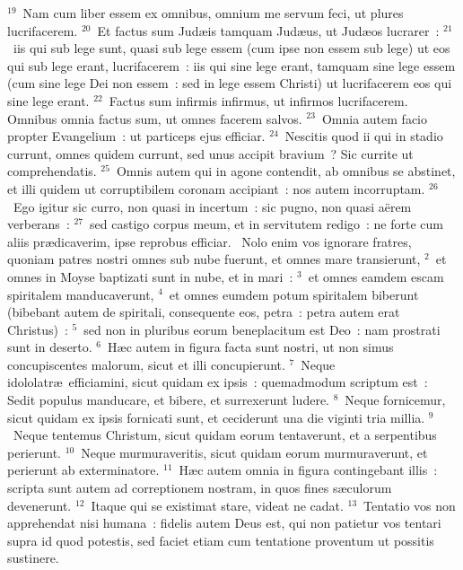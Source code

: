 ${}^{19}$~Nam cum liber essem ex omnibus, omnium me servum feci, ut plures lucrifacerem.
${}^{20}$~Et factus sum Jud\ae is tamquam Jud\ae us, ut Jud\ae os lucrarer~:
${}^{21}$~iis qui sub lege sunt, quasi sub lege essem (cum ipse non essem sub lege) ut eos qui sub lege erant, lucrifacerem~: iis qui sine lege erant, tamquam sine lege essem (cum sine lege Dei non essem~: sed in lege essem Christi) ut lucrifacerem eos qui sine lege erant.
${}^{22}$~Factus sum infirmis infirmus, ut infirmos lucrifacerem. Omnibus omnia factus sum, ut omnes facerem salvos.
${}^{23}$~Omnia autem facio propter Evangelium~: ut particeps ejus efficiar.
${}^{24}$~Nescitis quod ii qui in stadio currunt, omnes quidem currunt, sed unus accipit bravium~? Sic currite ut comprehendatis.
${}^{25}$~Omnis autem qui in agone contendit, ab omnibus se abstinet, et illi quidem ut corruptibilem coronam accipiant~: nos autem incorruptam.
${}^{26}$~Ego igitur sic curro, non quasi in incertum~: sic pugno, non quasi a\"erem verberans~:
${}^{27}$~sed castigo corpus meum, et in servitutem redigo~: ne forte cum aliis pr\ae dicaverim, ipse reprobus efficiar.
~Nolo enim vos ignorare fratres, quoniam patres nostri omnes sub nube fuerunt, et omnes mare transierunt,
${}^{2}$~et omnes in Moyse baptizati sunt in nube, et in mari~:
${}^{3}$~et omnes eamdem escam spiritalem manducaverunt,
${}^{4}$~et omnes eumdem potum spiritalem biberunt (bibebant autem de spiritali, consequente eos, petra~: petra autem erat Christus)~:
${}^{5}$~sed non in pluribus eorum beneplacitum est Deo~: nam prostrati sunt in deserto.
${}^{6}$~H\ae c autem in figura facta sunt nostri, ut non simus concupiscentes malorum, sicut et illi concupierunt.
${}^{7}$~Neque idololatr\ae\ efficiamini, sicut quidam ex ipsis~: quemadmodum scriptum est~: Sedit populus manducare, et bibere, et surrexerunt ludere.
${}^{8}$~Neque fornicemur, sicut quidam ex ipsis fornicati sunt, et ceciderunt una die viginti tria millia.
${}^{9}$~Neque tentemus Christum, sicut quidam eorum tentaverunt, et a serpentibus perierunt.
${}^{10}$~Neque murmuraveritis, sicut quidam eorum murmuraverunt, et perierunt ab exterminatore.
${}^{11}$~H\ae c autem omnia in figura contingebant illis~: scripta sunt autem ad correptionem nostram, in quos fines s\ae culorum devenerunt.
${}^{12}$~Itaque qui se existimat stare, videat ne cadat.
${}^{13}$~Tentatio vos non apprehendat nisi humana~: fidelis autem Deus est, qui non patietur vos tentari supra id quod potestis, sed faciet etiam cum tentatione proventum ut possitis sustinere.


